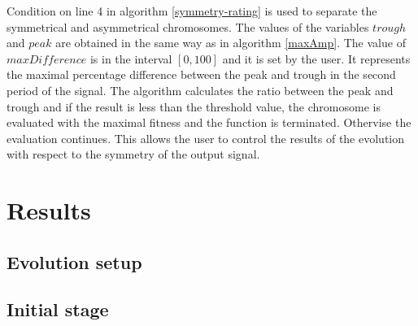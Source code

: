 Condition on line 4 in algorithm \ref{symmetry-rating} is used to separate the symmetrical and asymmetrical chromosomes. The values of the variables $trough$ and $peak$ are obtained in the same way as in algorithm \ref{maxAmp}. The value of $maxDifference$ is in the interval $\left[0, 100\right]$ and it is set by the user. It represents the maximal percentage difference between the peak and trough in the second period of the signal. The algorithm calculates the ratio between the peak and trough and if the result is less than the threshold value, the chromosome is evaluated with the maximal fitness and the function is terminated. Othervise the evaluation continues. This allows the user to control the results of the evolution with respect to the symmetry of the output signal.

\section{Results}

\subsection{Evolution setup}

\subsection{Initial stage}

